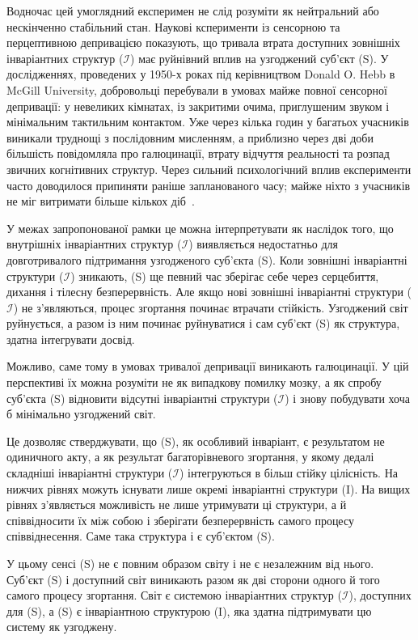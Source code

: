 \documentclass[aps,prd,onecolumn,nofootinbib,superscriptaddress]{revtex4-2}
\begin{document}
Водночас цей умоглядний експеримен не слід розуміти як нейтральний або нескінченно стабільний стан. Наукові ксперименти із сенсорною та перцептивною депривацією показують, що тривала втрата доступних зовнішніх інваріантних структур ($\mathcal{I}$) має руйнівний вплив на узгоджений суб’єкт (S). У дослідженнях, проведених у 1950-х роках під керівництвом Donald O. Hebb в McGill University, добровольці перебували в умовах майже повної сенсорної депривації: у невеликих кімнатах, із закритими очима, приглушеним звуком і мінімальним тактильним контактом. Уже через кілька годин у багатьох учасників виникали труднощі з послідовним мисленням, а приблизно через дві доби більшість повідомляла про галюцинації, втрату відчуття реальності та розпад звичних когнітивних структур. Через сильний психологічний вплив експерименти часто доводилося припиняти раніше запланованого часу; майже ніхто з учасників не міг витримати більше кількох діб~\cite{Hebb1958}.

У межах запропонованої рамки це можна інтерпретувати як наслідок того, що внутрішніх інваріантних структур ($\mathcal{I}$) виявляється недостатньо для довготривалого підтримання узгодженого суб’єкта (S). Коли зовнішні інваріантні структури ($\mathcal{I}$) зникають, (S) ще певний час зберігає себе через серцебиття, дихання і тілесну безперервність. Але якщо нові зовнішні інваріантні структури ($\mathcal{I}$) не з’являються, процес згортання починає втрачати стійкість. Узгоджений світ руйнується, а разом із ним починає руйнуватися і сам суб’єкт (S) як структура, здатна інтегрувати досвід.

Можливо, саме тому в умовах тривалої депривації виникають галюцинації. У цій перспективі їх можна розуміти не як випадкову помилку мозку, а як спробу суб’єкта (S) відновити відсутні інваріантні структури ($\mathcal{I}$) і знову побудувати хоча б мінімально узгоджений світ.

Це дозволяє стверджувати, що (S), як особливий інваріант, є результатом не одиничного акту, а як результат багаторівневого згортання, у якому дедалі складніші інваріантні структури ($\mathcal{I}$) інтегруються в більш стійку цілісність. На нижчих рівнях можуть існувати лише окремі інваріантні структури (I). На вищих рівнях з’являється можливість не лише утримувати ці структури, а й співвідносити їх між собою і зберігати безперервність самого процесу співвіднесення. Саме така структура і є суб’єктом (S).

У цьому сенсі (S) не є повним образом світу і не є незалежним від нього. Суб’єкт (S) і доступний світ виникають разом як дві сторони одного й того самого процесу згортання. Світ є системою інваріантних структур ($\mathcal{I}$), доступних для (S), а (S) є інваріантною структурою (I), яка здатна підтримувати цю систему як узгоджену.
\end{document}
